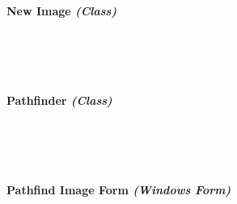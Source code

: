 \begin{FlushLeft}
    \bk

    \paragraph*{New Image \textit{(Class)}} \mbox{} \\

    \begin{figure}[H]
        \centering
    \end{figure}\\

    \bk

    \paragraph*{Pathfinder \textit{(Class)}} \mbox{} \\

    \begin{figure}[H]
        \centering
    \end{figure}\\

    \bk

    \paragraph*{Pathfind Image Form \textit{(Windows Form)}} \mbox{} \\


\end{FlushLeft}
